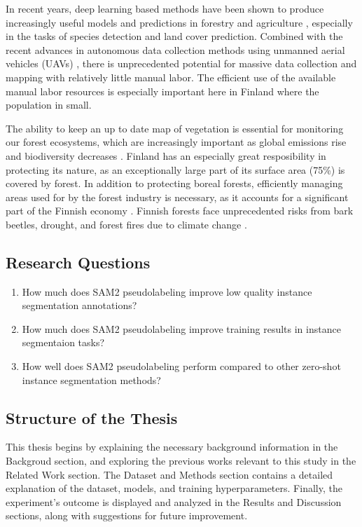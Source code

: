 \documentclass[english, 12pt, a4paper, sci, utf8, a-2b, online]{aaltothesis}
\begin{document}
In recent years, deep learning based methods have been shown to produce increasingly useful models and predictions in forestry and agriculture \cite{dl-forestry}, especially in the tasks of species detection and land cover prediction. Combined with the recent advances in autonomous data collection methods using unmanned aerial vehicles (UAVs) \cite{uav-data-collection}, there is unprecedented potential for massive data collection and mapping with relatively little manual labor. The efficient use of the available manual labor resources is especially important here in Finland where the population in small.

The ability to keep an up to date map of vegetation is essential for monitoring our forest ecosystems, which are increasingly important as global emissions rise and biodiversity decreases \cite{natural-resources-finland}. Finland has an especially great resposibility in protecting its nature, as an exceptionally large part of its surface area (75\%) is covered by forest. In addition to protecting boreal forests, efficiently managing areas used for by the forest industry is necessary, as it accounts for a significant part of the Finnish economy \cite{forest-industry-economy}. Finnish forests face unprecedented risks from bark beetles, drought, and forest fires due to climate change \cite{climate-change-finland-forestry}.

\subsection{Research Questions}

\begin{enumerate}
\item How much does SAM2 pseudolabeling improve low quality instance segmentation annotations?
\item How much does SAM2 pseudolabeling improve training results in instance segmentaion tasks?
\item How well does SAM2 pseudolabeling perform compared to other zero-shot instance segmentation methods?
\end{enumerate}

\subsection{Structure of the Thesis}

This thesis begins by explaining the necessary background information in the Backgroud section, and exploring the previous works relevant to this study in the Related Work section. The Dataset and Methods section contains a detailed explanation of the dataset, models, and training hyperparameters. Finally, the experiment's outcome is displayed and analyzed in the Results and Discussion sections, along with suggestions for future improvement.
\end{document}
